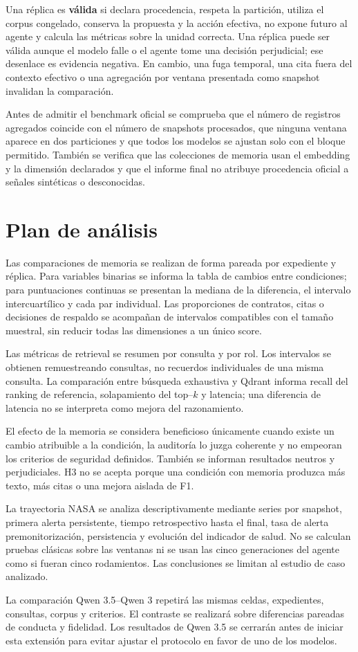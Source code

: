 Una réplica es \textbf{válida} si declara procedencia, respeta la partición,
utiliza el corpus congelado, conserva la propuesta y la acción efectiva, no
expone futuro al agente y calcula las métricas sobre la unidad correcta. Una
réplica puede ser válida aunque el modelo falle o el agente tome una decisión
perjudicial; ese desenlace es evidencia negativa. En cambio, una fuga temporal,
una cita fuera del contexto efectivo o una agregación por ventana presentada
como snapshot invalidan la comparación.

Antes de admitir el benchmark oficial se comprueba que el número de registros
agregados coincide con el número de snapshots procesados, que ninguna ventana
aparece en dos particiones y que todos los modelos se ajustan solo con el bloque
permitido. También se verifica que las colecciones de memoria usan el embedding
y la dimensión declarados y que el informe final no atribuye procedencia
oficial a señales sintéticas o desconocidas.

\section{Plan de análisis}

Las comparaciones de memoria se realizan de forma pareada por expediente y
réplica. Para variables binarias se informa la tabla de cambios entre
condiciones; para puntuaciones continuas se presentan la mediana de la
diferencia, el intervalo intercuartílico y cada par individual. Las proporciones
de contratos, citas o decisiones de respaldo se acompañan de intervalos compatibles con el
tamaño muestral, sin reducir todas las dimensiones a un único score.

Las métricas de retrieval se resumen por consulta y por rol. Los intervalos se
obtienen remuestreando consultas, no recuerdos individuales de una misma
consulta. La comparación entre búsqueda exhaustiva y Qdrant informa recall del
ranking de referencia, solapamiento del top--$k$ y latencia; una diferencia de
latencia no se interpreta como mejora del razonamiento.

El efecto de la memoria se considera beneficioso únicamente cuando existe un
cambio atribuible a la condición, la auditoría lo juzga coherente y no empeoran
los criterios de seguridad definidos. También se informan resultados neutros y
perjudiciales. H3 no se acepta porque una condición con memoria produzca más
texto, más citas o una mejora aislada de F1.

La trayectoria NASA se analiza descriptivamente mediante series por snapshot,
primera alerta persistente, tiempo retrospectivo hasta el final, tasa de alerta
premonitorización, persistencia y evolución del indicador de salud. No se
calculan pruebas clásicas sobre las ventanas ni se usan las cinco
generaciones del agente como si fueran cinco rodamientos. Las conclusiones se
limitan al estudio de caso analizado.

La comparación Qwen 3.5--Qwen 3 repetirá las mismas celdas, expedientes,
consultas, corpus y criterios. El contraste se realizará sobre diferencias
pareadas de conducta y fidelidad. Los resultados de Qwen 3.5 se cerrarán antes
de iniciar esta extensión para evitar ajustar el protocolo en favor de uno de
los modelos.
